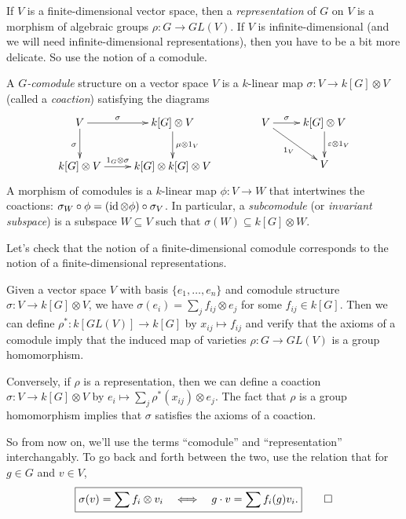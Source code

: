 
If $V$ is a finite-dimensional vector space, then a \emph{representation} of $G$ on $V$ is a morphism of algebraic groups $\rho\colon G\to GL(V)$. If $V$ is infinite-dimensional (and we will need infinite-dimensional representations), then you have to be a bit more delicate. So use the notion of a comodule.

\begin{definition}
 A \emph{$G$-comodule} structure on a vector space $V$ is a $k$-linear map $\sigma\colon V\to k[G]\otimes V$ (called a \emph{coaction}) satisfying the diagrams
 \[\xymatrix{
   V\ar[r]^-\sigma\ar[d]_\sigma & k[G]\otimes V\ar[d]^{\mu\otimes 1_V}\\
   k[G]\otimes V \ar[r]^-{1_G\otimes \sigma} & k[G]\otimes  k[G]\otimes V
  }\qquad\qquad
  \xymatrix{
   V\ar[r]^-\sigma \ar[dr]_{1_V} & k[G]\otimes V \ar[d]^{\e\otimes 1_V}\\
   & V
 }\]
 A morphism of comodules is a $k$-linear map $\phi\colon V\to W$ that intertwines the coactions: $\sigma_W\circ \phi = (\operatorname{id}\otimes\phi)\circ \sigma_V$. In particular, a \emph{subcomodule} (or \emph{invariant subspace}) is a subspace $W\subseteq V$ such that $\sigma(W)\subseteq k[G]\otimes W$.
\end{definition}
\begin{remark}\label{lec02Rmk:rep=comod}
 Let's check that the notion of a finite-dimensional comodule corresponds to the notion of a finite-dimensional representations.
 
 Given a vector space $V$ with basis $\{e_1,\dots, e_n\}$ and comodule structure $\sigma\colon V\to k[G]\otimes V$, we have $\sigma(e_i)=\sum_j f_{ij}\otimes e_j$ for some $f_{ij}\in k[G]$. Then we can define $\rho^*\colon k[GL(V)]\to k[G]$ by $x_{ij}\mapsto f_{ij}$ and verify that the axioms of a comodule imply that the induced map of varieties $\rho\colon G\to GL(V)$ is a group homomorphism.
 
 Conversely, if $\rho$ is a representation, then we can define a coaction $\sigma\colon V\to k[G]\otimes V$ by $e_i\mapsto \sum_j \rho^*(x_{ij})\otimes e_j$. The fact that $\rho$ is a group homomorphism implies that $\sigma$ satisfies the axioms of a coaction.
 
 So from now on, we'll use the terms ``comodule'' and ``representation'' interchangably. To go back and forth between the two, use the relation that for $g\in G$ and $v\in V$,
 \[
  \fbox{$\displaystyle\sigma(v)=\sum f_i\otimes v_i \quad \Longleftrightarrow \quad g\cdot v = \sum f_i(g)v_i.$}\qedhere
 \]
\end{remark}
